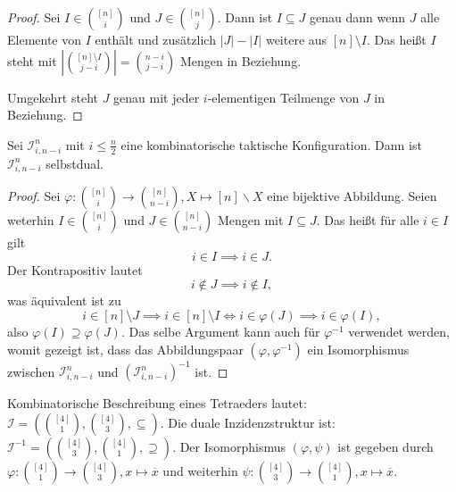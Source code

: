 \documentclass{article}
\begin{document}
\begin{proof}
  Sei $I \in \binom{[n]}{i}$ und $J \in \binom{[n]}{j}$.
  Dann ist $I \subseteq J$ genau dann wenn $J$ alle Elemente von $I$ enthält
  und zusätzlich $|J| - |I|$ weitere aus $[n] \setminus I$.
  Das heißt $I$ steht mit $|\binom{[n] \setminus I}{j - i}| = \binom{n - i}{j - i}$ Mengen in Beziehung.

  Umgekehrt steht $J$ genau mit jeder $i$-elementigen Teilmenge von $J$ in Beziehung.
\end{proof}

\begin{theorem}
  Sei $\mathcal{I}^n_{i, n - i}$ mit $i \leq \frac{n}{2}$ eine kombinatorische taktische Konfiguration.
  Dann ist $\mathcal{I}^n_{i, n - i}$ selbstdual.
\end{theorem}
\begin{proof}
  Sei $\varphi \colon \binom{[n]}{i} \to \binom{[n]}{n - i}, X \mapsto [n] \backslash X$ eine bijektive Abbildung.
  Seien weterhin $I \in \binom{[n]}{i}$ und $J \in \binom{[n]}{n - i}$ Mengen
  mit $I \subseteq J$.
  Das heißt für alle $i \in I$ gilt
  \begin{equation*}
    i \in I \implies i \in J.
  \end{equation*}
  Der Kontrapositiv lautet
  \begin{equation*}
    i \notin J \implies i \notin I,
  \end{equation*}
  was äquivalent ist zu
  \begin{equation*}
    i \in [n] \setminus J \implies i \in [n] \setminus I
    \iff i \in \varphi(J) \implies i \in \varphi(I),
  \end{equation*}
  also $\varphi(I) \supseteq \varphi(J)$.
  Das selbe Argument kann auch für $\varphi^{-1}$ verwendet werden,
  womit gezeigt ist,
  dass das Abbildungspaar $(\varphi, \varphi^{-1})$ ein Isomorphismus
  zwischen $\mathcal{I}^n_{i, n - i}$ und $(\mathcal{I}^n_{i, n - i})^{-1}$ ist.
\end{proof}

\begin{example}[Tetraeder]
  Kombinatorische Beschreibung eines Tetraeders lautet: ${\mathcal{I} =  (\binom{[4]}{1}, \binom{[4]}{3}, \subseteq)}$.
  Die duale Inzidenzstruktur ist: ${\mathcal{I}^{-1} = (\binom{[4]}{3}, \binom{[4]}{1}, \supseteq)}$.
  Der Isomorphismus  $(\varphi, \psi)$ ist gegeben durch
  ${\varphi \colon \binom{[4]}{1} \to \binom{[4]}{3}, x \mapsto \overline{x}}$
  und weiterhin ${\psi \colon \binom{[4]}{3} \to \binom{[4]}{1}, x \mapsto \overline{x}}$.
\end{example}
\end{document}
